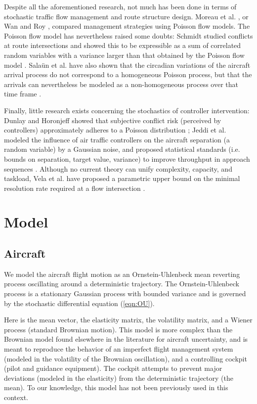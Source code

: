 \documentclass[conference]{IEEEtran}
\begin{document}
Despite all the aforementioned research, not much has been done in terms of stochastic traffic flow management and route structure design. Moreau et al. \cite{moreau2005}, or Wan and Roy \cite{Wan09}, compared management strategies using Poisson flow models. The Poisson flow model has nevertheless raised some doubts: Schmidt studied conflicts at route intersections and showed this to be expressible as a sum of correlated random variables with a variance larger than that obtained by the Poisson flow model \cite{Sch77}. Sala\"{u}n et al. have also shown that the circadian variations of the aircraft arrival process do not correspond to a homogeneous Poisson process, but that the arrivals can nevertheless be modeled as a non-homogeneous process over that time frame \cite{Sal10}.

Finally, little research exists concerning the stochastics of controller intervention: Dunlay and Horonjeff showed that subjective conflict risk (perceived by controllers) approximately adheres to a Poisson distribution \cite{Dun75}; Jeddi et al. modeled the influence of air traffic controllers on the aircraft separation (a random variable) by a Gaussian noise, and proposed statistical standards (i.e. bounds on separation, target value, variance) to improve throughput in approach sequences \cite{Jed08}. Although no current theory can unify complexity, capacity, and taskload, Vela et al. have proposed a parametric upper bound on the minimal resolution rate required at a flow intersection \cite{Vel10}.

\section{Model}
\label{sec:model}

\subsection{Aircraft}
We model the aircraft flight motion as an Ornstein-Uhlenbeck mean reverting process oscillating around a deterministic trajectory. The Ornstein-Uhlenbeck process is a stationary Gaussian process with bounded variance and is governed by the stochastic differential equation (\ref{eqn:OU}).



Here  is the mean vector,  the elasticity matrix,  the volatility matrix, and  a Wiener process (standard Brownian motion). This model is more complex than the Brownian model found elsewhere in the literature for aircraft uncertainty, and is meant to reproduce the behavior of an imperfect flight management system (modeled in the volatility of the Brownian oscillation), and a controlling cockpit (pilot and guidance equipment). The cockpit attempts to prevent major deviations (modeled in the elasticity) from the deterministic trajectory (the mean). To our knowledge, this model has not been previously used in this context. 
\end{document}
